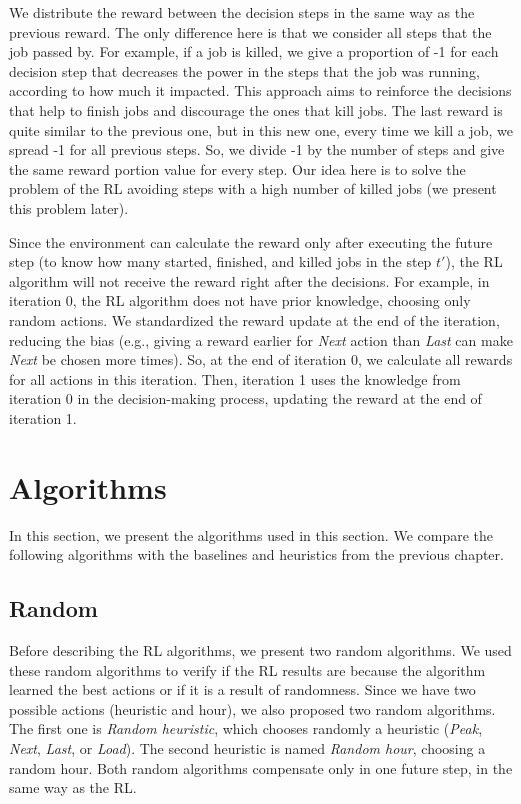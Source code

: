 We distribute the reward between the decision steps in the same way as the previous reward. The only difference here is that we consider all steps that the job passed by. For example, if a job is killed, we give a proportion of -1 for each decision step that decreases the power in the steps that the job was running, according to how much it impacted. This approach aims to reinforce the decisions that help to finish jobs and discourage the ones that kill jobs. The last reward is quite similar to the previous one, but in this new one, every time we kill a job, we spread -1 for all previous steps. So, we divide -1 by the number of steps and give the same reward portion value for every step. Our idea here is to solve the problem of the RL avoiding steps with a high number of killed jobs (we present this problem later).

Since the environment can calculate the reward only after executing the future step (to know how many started, finished, and killed jobs in the step $t'$), the RL algorithm will not receive the reward right after the decisions. For example, in iteration 0, the RL algorithm does not have prior knowledge, choosing only random actions. We standardized the reward update at the end of the iteration, reducing the bias (e.g., giving a reward earlier for \emph{Next} action than \emph{Last} can make \emph{Next} be chosen more times). So, at the end of iteration 0, we calculate all rewards for all actions in this iteration. Then, iteration 1 uses the knowledge from iteration 0 in the decision-making process, updating the reward at the end of iteration 1.

\section{Algorithms}
\label{sec:RL_algos}
In this section, we present the algorithms used in this section. We compare the following algorithms with the baselines and heuristics from the previous chapter.

\subsection{Random}
Before describing the RL algorithms, we present two random algorithms. We used these random algorithms to verify if the RL results are because the algorithm learned the best actions or if it is a result of randomness. Since we have two possible actions (heuristic and hour), we also proposed two random algorithms. The first one is \emph{Random heuristic}, which chooses randomly a heuristic (\emph{Peak}, \emph{Next}, \emph{Last}, or \emph{Load}). The second heuristic is named \emph{Random hour}, choosing a random hour. Both random algorithms compensate only in one future step, in the same way as the RL.

